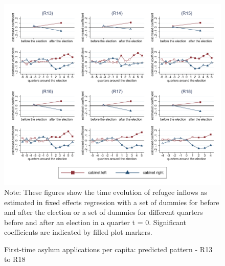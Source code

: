 \documentclass[11pt,a4paper]{scrartcl}
\begin{document}
\clearpage
\FloatBarrier
\begin{figure}[!ht]
	\caption{First-time asylum applications per capita: predicted pattern - R13 to R18}
	\includegraphics[width=1\textwidth]{../results/applications/app_graphs_R13-R18.pdf}
	\scriptsize{Note: These figures show the time evolution of refugee inflows as estimated in fixed effects regression
		with a set of dummies for before and after the election or a set of dummies for different quarters before and after an election in a quarter t = 0. Significant coefficients are indicated by filled plot markers.}
\end{figure}

\clearpage
\FloatBarrier



\clearpage
\FloatBarrier


\clearpage
\FloatBarrier




\clearpage
\FloatBarrier

\end{document}
